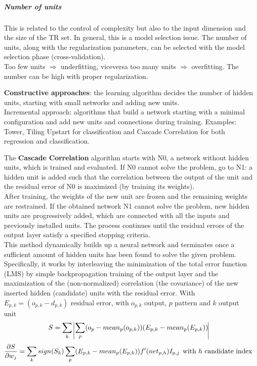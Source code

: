 \documentclass[10pt]{report}
\begin{document}
\subparagraph{Number of units} This is related to the control of complexity but also to the input dimension and the size of the TR set. In general, this is a model selection issue. The number of units, along with the regularization parameters, can be selected with the model selection phase (cross-validation).\\
Too few units $\Rightarrow$ underfitting, viceversa too many units $\Rightarrow$ overfitting. The number can be high with proper regularization.
\begin{list}{}{}
	\item \textbf{Constructive approaches}: the learning algorithm decides the number of hidden units, starting with small networks and adding new units.\\
	Incremental approach: algorithms that build a network starting with a minimal configuration and add new units and connections during training. Examples: Tower, Tiling Upstart for classification and Cascade Correlation for both regression and classification.\begin{list}{}{}
		\item The \textbf{Cascade Correlation} algorithm starts with N0, a network without hidden units, which is trained and evaluated. If N0 cannot solve the problem, go to N1: a hidden unit is added such that the correlation between the output of the unit and the residual error of N0 is maximized (by training its weights).\\
		After training, the weights of the new unit are frozen and the remaining weights are restrained. If the obtained network N1 cannot solve the problem, new hidden units are progressively added, which are connected with all the inputs and previously installed units. The process continues until the residual errors of the output layer satisfy a specified stopping criteria.\\
		This method dynamically builds up a neural network and terminates once a sufficient amount of hidden units has been found to solve the given problem. Specifically, it works by interleaving the minimization of the total error function (LMS) by simple backpropagation training of the output layer and the maximization of the (non-normalized) correlation (the covariance) of the new inserted hidden (candidate) units with the residual error. With $E_{p,k} = (o_{p,k} - d_{p,k})$ residual error, with $o_{p,k}$ output, $p$ pattern and $k$ output unit
		$$S = \sum_k\:\vline\sum_p(o_p - mean_p(o_{p,k}))(E_{p,k} - mean_p(E_{p,k}))\vline$$
		$$\frac{\partial S}{\partial w_j} = \sum_k sign(S_k)\sum_p(E_{p,k} - mean_p(E_{p,k}))f'(net_{p,h})I_{p,j}\:\:\text{with }h\hbox{ candidate index}$$

\end{list}
\end{list}
\end{document}
